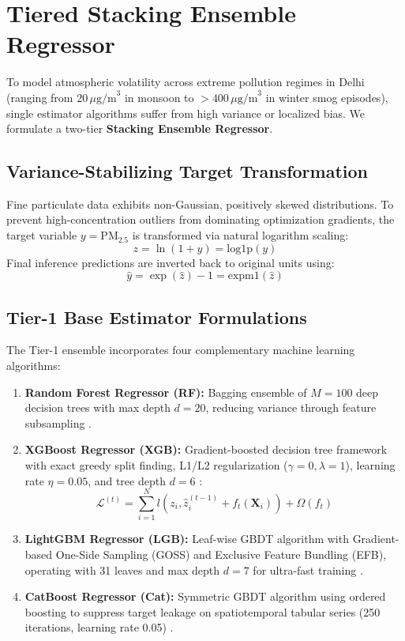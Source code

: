 \documentclass[journal]{IEEEtran}
\begin{document}
\section{Tiered Stacking Ensemble Regressor}
To model atmospheric volatility across extreme pollution regimes in Delhi (ranging from $20\,\mu\text{g/m}^3$ in monsoon to $>400\,\mu\text{g/m}^3$ in winter smog episodes), single estimator algorithms suffer from high variance or localized bias. We formulate a two-tier \textbf{Stacking Ensemble Regressor}.

\subsection{Variance-Stabilizing Target Transformation}
Fine particulate data exhibits non-Gaussian, positively skewed distributions. To prevent high-concentration outliers from dominating optimization gradients, the target variable $y = \text{PM}_{2.5}$ is transformed via natural logarithm scaling:
\begin{equation}
z = \ln(1 + y) = \text{log1p}(y)
\end{equation}
Final inference predictions are inverted back to original units using:
\begin{equation}
\hat{y} = \exp(\hat{z}) - 1 = \text{expm1}(\hat{z})
\end{equation}

\subsection{Tier-1 Base Estimator Formulations}
The Tier-1 ensemble incorporates four complementary machine learning algorithms:
\begin{enumerate}
    \item \textbf{Random Forest Regressor (RF):} Bagging ensemble of $M=100$ deep decision trees with max depth $d=20$, reducing variance through feature subsampling \cite{breiman2001}.
    \item \textbf{XGBoost Regressor (XGB):} Gradient-boosted decision tree framework with exact greedy split finding, L1/L2 regularization ($\gamma=0, \lambda=1$), learning rate $\eta=0.05$, and tree depth $d=6$ \cite{chen2016}:
    \begin{equation}
    \mathcal{L}^{(t)} = \sum_{i=1}^N l\left(z_i, \hat{z}_i^{(t-1)} + f_t(\mathbf{X}_i)\right) + \Omega(f_t)
    \end{equation}
    \item \textbf{LightGBM Regressor (LGB):} Leaf-wise GBDT algorithm with Gradient-based One-Side Sampling (GOSS) and Exclusive Feature Bundling (EFB), operating with 31 leaves and max depth $d=7$ for ultra-fast training \cite{ke2017}.
    \item \textbf{CatBoost Regressor (Cat):} Symmetric GBDT algorithm using ordered boosting to suppress target leakage on spatiotemporal tabular series (250 iterations, learning rate 0.05) \cite{prokhorenkova2018}.
\end{enumerate}
\end{document}
